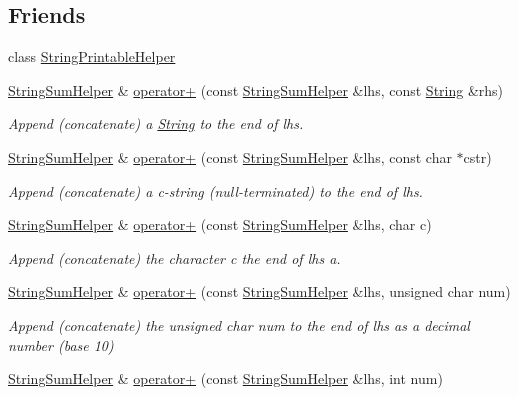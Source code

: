 \subsection*{Friends}
\begin{DoxyCompactItemize}
\item 
class \hyperlink{class_string_a5e68bdc5e2e049ec2703293759e6049a}{String\+Printable\+Helper}
\item 
\hyperlink{class_string_sum_helper}{String\+Sum\+Helper} \& \hyperlink{class_string_a2fb327465c18d4346465237d8a38938c}{operator+} (const \hyperlink{class_string_sum_helper}{String\+Sum\+Helper} \&lhs, const \hyperlink{class_string}{String} \&rhs)
\begin{DoxyCompactList}\small\item\em Append (concatenate) a \hyperlink{class_string}{String} to the end of lhs. \end{DoxyCompactList}\item 
\hyperlink{class_string_sum_helper}{String\+Sum\+Helper} \& \hyperlink{class_string_aa0fe70fca3cf4c9c3c1e77d2465a9bd9}{operator+} (const \hyperlink{class_string_sum_helper}{String\+Sum\+Helper} \&lhs, const char $\ast$cstr)
\begin{DoxyCompactList}\small\item\em Append (concatenate) a c-\/string (null-\/terminated) to the end of lhs. \end{DoxyCompactList}\item 
\hyperlink{class_string_sum_helper}{String\+Sum\+Helper} \& \hyperlink{class_string_a15c2c0bbe928e2bbf5278c8537bcfda4}{operator+} (const \hyperlink{class_string_sum_helper}{String\+Sum\+Helper} \&lhs, char c)
\begin{DoxyCompactList}\small\item\em Append (concatenate) the character c the end of lhs a. \end{DoxyCompactList}\item 
\hyperlink{class_string_sum_helper}{String\+Sum\+Helper} \& \hyperlink{class_string_a8b0c50963eaaf2366de418e1fba34cf1}{operator+} (const \hyperlink{class_string_sum_helper}{String\+Sum\+Helper} \&lhs, unsigned char num)
\begin{DoxyCompactList}\small\item\em Append (concatenate) the unsigned char num to the end of lhs as a decimal number (base 10) \end{DoxyCompactList}\item 
\hyperlink{class_string_sum_helper}{String\+Sum\+Helper} \& \hyperlink{class_string_a0c7b23137b894e0e6d7607d8386a9285}{operator+} (const \hyperlink{class_string_sum_helper}{String\+Sum\+Helper} \&lhs, int num)

\end{DoxyCompactItemize}
